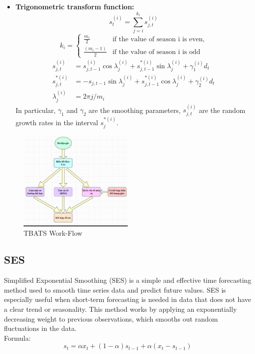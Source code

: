 \documentclass{ieeeojies}
\begin{document}
\begin{itemize}
    
    \item \textbf{Trigonometric transform function:}
    \[
    s_t^{(i)} = \sum_{j=i}^{k_i} s_{j,t}^{(i)}
    \]
    \[
    k_i = 
    \begin{cases} 
    \frac{m_i}{2} & \text{if the value of season i is even,} \\
    \frac{(m_i - 1)}{2} & \text{if the value of season i is odd}
    \end{cases}
    \]
    \begin{align*}
    s_{j,t}^{(i)} &= s_{j,t-1}^{(i)} \cos \lambda_j^{(i)} + s_{j,t-1}^{*(i)} \sin \lambda_j^{(i)} + \gamma_1^{(i)} d_t \\
    s_{j,t}^{*(i)} &= -s_{j,t-1} \sin \lambda_j^{(i)} + s_{j,t-1}^{*(i)} \cos \lambda_j^{(i)} + \gamma_2^{(i)} d_t \\
    \lambda_j^{(i)} &= 2\pi j / m_i
    \end{align*}
In particular, \( \gamma_1 \) and \( \gamma_2 \) are the smoothing parameters, \( s_{j,t}^{(i)} \) are the random growth rates in the interval \( s_j^{*(i)} \).


\end{itemize}





\begin{figure}[H]
    \centering
    \includegraphics[width=0.5\textwidth]{bibliography/Figure/tbats.png}
    \caption{TBATS Work-Flow}
    \label{fig:tbats_workflow}
\end{figure}

\subsection{SES}
Simplified Exponential Smoothing (SES) is a simple and effective time forecasting method used to smooth time series data and predict future values. SES is especially useful when short-term forecasting is needed in data that does not have a clear trend or seasonality. This method works by applying an exponentially decreasing weight to previous observations, which smooths out random fluctuations in the data. 
\\
Formula: 
\begin{equation}
s_t = \alpha x_t + (1 - \alpha) s_{t-1} + \alpha (x_t - s_{t-1})
\end{equation}
\end{document}
